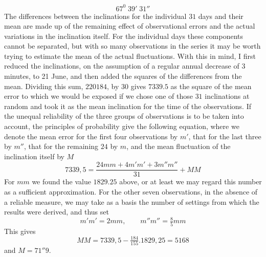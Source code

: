 \[
67^0\;39'\;31''
\]
The differences between the inclinations for the individual $31$ days and their mean are made up of the remaining effect of observational errors and the actual variations in the inclination itself. For the
individual days these components cannot be separated, but with so many observations in the series it may be worth trying to estimate the mean of the actual fluctuations. With this in mind, I first reduced the inclinations, on the assumption of a regular annual decrease of $3$ minutes, to 21 June, and then added the squares of the differences from the mean. Dividing this sum, $220184$, by $30$ gives $7339.5$ as the square of the mean error to which we would be exposed if we chose one of those $31$ inclinations at random and took it as the mean inclination for the time of the observations. If the unequal reliability of the three groups of observations is to be taken into account, the principles of probability give the following equation, where we denote the mean error for the first four observations by $m'$, that for the last three by $m''$, that for the remaining $24$ by $m$, and the mean fluctuation of the inclination itself by $M$
\[
7339{,}5=\frac{24mm+4m'm'+3m''m''}{31}+MM
\]
For $mm$ we found the value $1829.25$ above, or at least we may regard this number as a sufficient approximation. For the other seven observations, in the absence of a reliable measure, we may take as a basis the number of settings from which the results were derived, and thus set
\[
m'm'=2mm,\qquad m''m''=\tfrac85mm
\]
This gives
\[
MM=7339{,}5-\tfrac{184}{155}.1829{,}25=5168
\]
and $M=71''9$.

